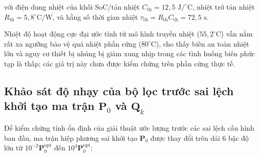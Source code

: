 với điện dung nhiệt của khối SoC/tản nhiệt $C_{\text{th}} = 12{,}5\text{ J/}^\circ\text{C}$, nhiệt trở tản nhiệt $R_{\text{th}} = 5{,}8^\circ\text{C/W}$, và hằng số thời gian nhiệt $\tau_{\text{th}} = R_{\text{th}} C_{\text{th}} = 72{,}5$ s.

\begin{table}[H]
\centering
\caption{Ước tính nhiệt độ đỉnh và độ tăng nhiệt độ SoC theo mô hình truyền nhiệt lý thuyết khi kích hoạt liên tục các kịch bản sự cố biên}
\label{tab:transient-thermal-response-table}
\end{table}

Nhiệt độ hoạt động cực đại ước tính từ mô hình truyền nhiệt ($55{,}2^\circ\text{C}$) vẫn nằm rất xa ngưỡng bảo vệ quá nhiệt phần cứng ($80^\circ\text{C}$), cho thấy biên an toàn nhiệt lớn và nguy cơ thiết bị nhúng bị giảm xung nhịp trong các tình huống biên phức tạp là thấp; các giá trị này chưa được kiểm chứng trên phần cứng thực tế.

\subsection{Khảo sát độ nhạy của bộ lọc trước sai lệch khởi tạo ma trận \texorpdfstring{$\mathbf{P}_0$ và $\mathbf{Q}_k$}{P0 và Qk}}

\hspace{0.5cm} Để kiểm chứng tính ổn định của giải thuật ước lượng trước các sai lệch cấu hình ban đầu, ma trận hiệp phương sai khởi tạo $\mathbf{P}_0$ được thay đổi trên dải 6 bậc độ lớn từ $10^{-2} \mathbf{P}_0^{\text{opt}}$ đến $10^4 \mathbf{P}_0^{\text{opt}}$:

